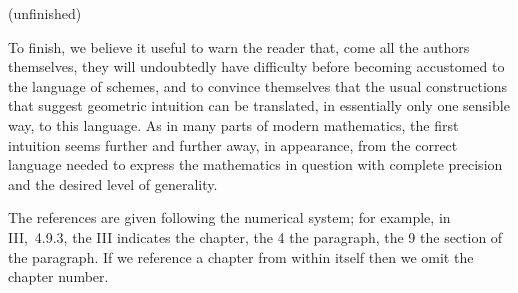 \documentclass[../main.tex]{subfiles}
\begin{document}
\asttri

(unfinished)

\asttri

To finish, we believe it useful to warn the reader that, come all the authors themselves, they will undoubtedly have difficulty before becoming accustomed to the language of schemes, and to convince themselves that the usual constructions that suggest geometric intuition can be translated, in essentially only one sensible way, to this language.
As in many parts of modern mathematics, the first intuition seems further and further away, in appearance, from the correct language needed to express the mathematics in question with complete precision and the desired level of generality.


\asttri

The references are given following the numerical system; for example, in III,~4.9.3, the III indicates the chapter, the 4 the paragraph, the 9 the section of the paragraph.
If we reference a chapter from within itself then we omit the chapter number.
\end{document}
